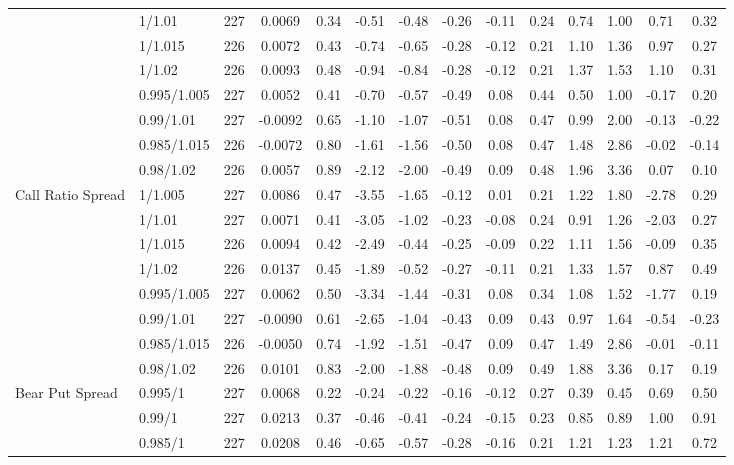 \begin{tabular}{llcccccccccccc}
 & 1/1.01 & 227 & 0.0069 & 0.34 & -0.51 & -0.48 & -0.26 & -0.11 & 0.24 & 0.74 & 1.00 & 0.71 & 0.32 \\
 & 1/1.015 & 226 & 0.0072 & 0.43 & -0.74 & -0.65 & -0.28 & -0.12 & 0.21 & 1.10 & 1.36 & 0.97 & 0.27 \\
 & 1/1.02 & 226 & 0.0093 & 0.48 & -0.94 & -0.84 & -0.28 & -0.12 & 0.21 & 1.37 & 1.53 & 1.10 & 0.31 \\
 & 0.995/1.005 & 227 & 0.0052 & 0.41 & -0.70 & -0.57 & -0.49 & 0.08 & 0.44 & 0.50 & 1.00 & -0.17 & 0.20 \\
 & 0.99/1.01 & 227 & -0.0092 & 0.65 & -1.10 & -1.07 & -0.51 & 0.08 & 0.47 & 0.99 & 2.00 & -0.13 & -0.22 \\
 & 0.985/1.015 & 226 & -0.0072 & 0.80 & -1.61 & -1.56 & -0.50 & 0.08 & 0.47 & 1.48 & 2.86 & -0.02 & -0.14 \\
 & 0.98/1.02 & 226 & 0.0057 & 0.89 & -2.12 & -2.00 & -0.49 & 0.09 & 0.48 & 1.96 & 3.36 & 0.07 & 0.10 \\
Call Ratio Spread & 1/1.005 & 227 & 0.0086 & 0.47 & -3.55 & -1.65 & -0.12 & 0.01 & 0.21 & 1.22 & 1.80 & -2.78 & 0.29 \\
 & 1/1.01 & 227 & 0.0071 & 0.41 & -3.05 & -1.02 & -0.23 & -0.08 & 0.24 & 0.91 & 1.26 & -2.03 & 0.27 \\
 & 1/1.015 & 226 & 0.0094 & 0.42 & -2.49 & -0.44 & -0.25 & -0.09 & 0.22 & 1.11 & 1.56 & -0.09 & 0.35 \\
 & 1/1.02 & 226 & 0.0137 & 0.45 & -1.89 & -0.52 & -0.27 & -0.11 & 0.21 & 1.33 & 1.57 & 0.87 & 0.49 \\
 & 0.995/1.005 & 227 & 0.0062 & 0.50 & -3.34 & -1.44 & -0.31 & 0.08 & 0.34 & 1.08 & 1.52 & -1.77 & 0.19 \\
 & 0.99/1.01 & 227 & -0.0090 & 0.61 & -2.65 & -1.04 & -0.43 & 0.09 & 0.43 & 0.97 & 1.64 & -0.54 & -0.23 \\
 & 0.985/1.015 & 226 & -0.0050 & 0.74 & -1.92 & -1.51 & -0.47 & 0.09 & 0.47 & 1.49 & 2.86 & -0.01 & -0.11 \\
 & 0.98/1.02 & 226 & 0.0101 & 0.83 & -2.00 & -1.88 & -0.48 & 0.09 & 0.49 & 1.88 & 3.36 & 0.17 & 0.19 \\
Bear Put Spread & 0.995/1 & 227 & 0.0068 & 0.22 & -0.24 & -0.22 & -0.16 & -0.12 & 0.27 & 0.39 & 0.45 & 0.69 & 0.50 \\
 & 0.99/1 & 227 & 0.0213 & 0.37 & -0.46 & -0.41 & -0.24 & -0.15 & 0.23 & 0.85 & 0.89 & 1.00 & 0.91 \\
 & 0.985/1 & 227 & 0.0208 & 0.46 & -0.65 & -0.57 & -0.28 & -0.16 & 0.21 & 1.21 & 1.23 & 1.21 & 0.72 \\

\end{tabular}
